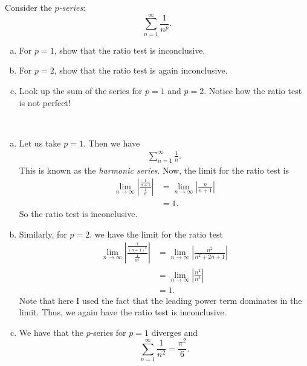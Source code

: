 \documentclass[12pt]{article} %
\begin{document}
\newpage
\begin{problem}
Consider the \emph{$p$-series}:
\[
\sum_{n=1}^\infty \frac{1}{n^p}.
\]
\begin{enumerate}[(a)]
    \item For $p=1$, show that the ratio test is inconclusive.
    \item For $p=2$, show that the ratio test is again inconclusive.
    \item Look up the sum of the series for $p=1$ and $p=2$.  Notice how the ratio test is not perfect!
\end{enumerate}
\end{problem}
\begin{solution}~
\begin{enumerate}[(a)]
    \item Let us take $p=1$. Then we have
    \begin{align*}
        \sum_{n=1}^\infty \frac{1}{n}.
    \end{align*}
    This is known as the \emph{harmonic series}.  Now, the limit for the ratio test is
    \begin{align*}
        \lim_{n\to \infty} \left| \frac{\frac{1}{n+1}}{\frac{1}{n}}\right| &= \lim_{n\to \infty} \left| \frac{n}{n+1} \right|\\
        &= 1.
    \end{align*}
    So the ratio test is inconclusive.
    \item Similarly, for $p=2$, we have the limit for the ratio test
    \begin{align*}
                \lim_{n\to \infty} \left| \frac{\frac{1}{(n+1)^2}}{\frac{1}{n^2}}\right| &= \lim_{n\to \infty} \left| \frac{n^2}{n^2+2n+1} \right|\\
                &= \lim_{n\to \infty} \left| \frac{n^2}{n^2}\right|\\
                &=1.
    \end{align*}
    Note that here I used the fact that the leading power term dominates in the limit.  Thus, we again have the ratio test is inconclusive.
    \item We have that the $p$-series for $p=1$ diverges and 
    \[
    \sum_{n=1}^\infty \frac{1}{n^2} = \frac{\pi^2}{6}.
    \]
\end{enumerate}
\end{solution}
\end{document}
